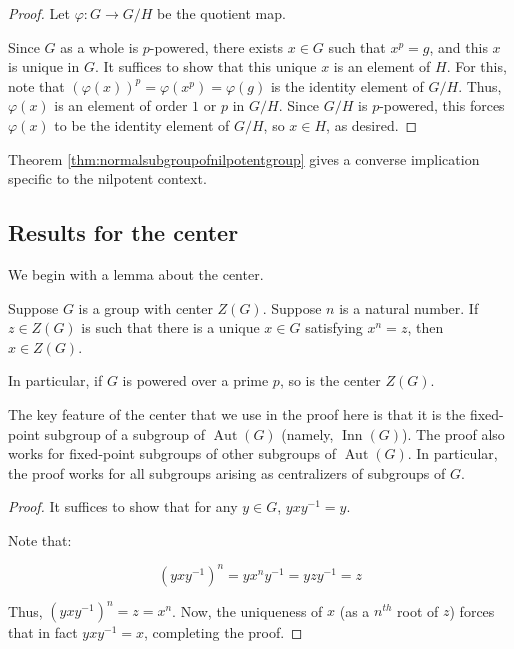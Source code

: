 \begin{proof}
  Let $\varphi:G \to G/H$ be the quotient map.

  Since $G$ as a whole is $p$-powered, there exists $x \in G$ such
  that $x^p = g$, and this $x$ is unique in $G$. It suffices to show
  that this unique $x$ is an element of $H$. For this, note that
  $(\varphi(x))^p = \varphi(x^p) = \varphi(g)$ is the identity element
  of $G/H$. Thus, $\varphi(x)$ is an element of order $1$ or $p$ in
  $G/H$. Since $G/H$ is $p$-powered, this forces $\varphi(x)$ to be
  the identity element of $G/H$, so $x \in H$, as desired.
\end{proof}

Theorem \ref{thm:normalsubgroupofnilpotentgroup} gives a converse
implication specific to the nilpotent context.


\subsection{Results for the center}

We begin with a lemma about the center.

\begin{lemma}\label{lemma:centerispoweringinvariant}
  Suppose $G$ is a group with center $Z(G)$. Suppose $n$ is a natural
  number. If $z \in Z(G)$ is such that there is a unique $x \in G$
  satisfying $x^n = z$, then  $x \in Z(G)$.

  In particular, if $G$ is powered over a prime $p$,
  so is the center $Z(G)$.
\end{lemma}

The key feature of the center that we use in the proof here is that it
is the fixed-point subgroup of a subgroup of $\operatorname{Aut}(G)$
(namely, $\operatorname{Inn}(G)$). The proof also works for
fixed-point subgroups of other subgroups of
$\operatorname{Aut}(G)$. In particular, the proof works for all
subgroups arising as centralizers of subgroups of $G$.

\begin{proof}
  It suffices to show that for any $y \in G$, $yxy^{-1} = y$.

  Note that:

  $$(yxy^{-1})^n = yx^ny^{-1} = yzy^{-1} = z$$

  Thus, $(yxy^{-1})^n = z = x^n$. Now, the uniqueness of $x$ (as a
  $n^{th}$ root of $z$) forces that in fact $yxy^{-1} = x$, completing
  the proof.
\end{proof}


